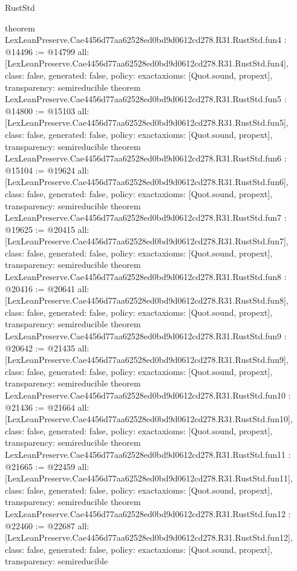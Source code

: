 \begin{lexlean}{RustStd}
\begin{coremodule}
{}
theorem LexLeanPreserve.Cae4456d77aa62528ed0bd9d0612cd278.R31.RustStd.fun4 : @14496 := @14799 {
  all: [LexLeanPreserve.Cae4456d77aa62528ed0bd9d0612cd278.R31.RustStd.fun4],
  class: false,
  generated: false,
  policy: exact{axioms: [Quot.sound, propext]},
  transparency: semireducible
}
theorem LexLeanPreserve.Cae4456d77aa62528ed0bd9d0612cd278.R31.RustStd.fun5 : @14800 := @15103 {
  all: [LexLeanPreserve.Cae4456d77aa62528ed0bd9d0612cd278.R31.RustStd.fun5],
  class: false,
  generated: false,
  policy: exact{axioms: [Quot.sound, propext]},
  transparency: semireducible
}
theorem LexLeanPreserve.Cae4456d77aa62528ed0bd9d0612cd278.R31.RustStd.fun6 : @15104 := @19624 {
  all: [LexLeanPreserve.Cae4456d77aa62528ed0bd9d0612cd278.R31.RustStd.fun6],
  class: false,
  generated: false,
  policy: exact{axioms: [Quot.sound, propext]},
  transparency: semireducible
}
theorem LexLeanPreserve.Cae4456d77aa62528ed0bd9d0612cd278.R31.RustStd.fun7 : @19625 := @20415 {
  all: [LexLeanPreserve.Cae4456d77aa62528ed0bd9d0612cd278.R31.RustStd.fun7],
  class: false,
  generated: false,
  policy: exact{axioms: [Quot.sound, propext]},
  transparency: semireducible
}
theorem LexLeanPreserve.Cae4456d77aa62528ed0bd9d0612cd278.R31.RustStd.fun8 : @20416 := @20641 {
  all: [LexLeanPreserve.Cae4456d77aa62528ed0bd9d0612cd278.R31.RustStd.fun8],
  class: false,
  generated: false,
  policy: exact{axioms: [Quot.sound, propext]},
  transparency: semireducible
}
theorem LexLeanPreserve.Cae4456d77aa62528ed0bd9d0612cd278.R31.RustStd.fun9 : @20642 := @21435 {
  all: [LexLeanPreserve.Cae4456d77aa62528ed0bd9d0612cd278.R31.RustStd.fun9],
  class: false,
  generated: false,
  policy: exact{axioms: [Quot.sound, propext]},
  transparency: semireducible
}
theorem LexLeanPreserve.Cae4456d77aa62528ed0bd9d0612cd278.R31.RustStd.fun10 : @21436 := @21664 {
  all: [LexLeanPreserve.Cae4456d77aa62528ed0bd9d0612cd278.R31.RustStd.fun10],
  class: false,
  generated: false,
  policy: exact{axioms: [Quot.sound, propext]},
  transparency: semireducible
}
theorem LexLeanPreserve.Cae4456d77aa62528ed0bd9d0612cd278.R31.RustStd.fun11 : @21665 := @22459 {
  all: [LexLeanPreserve.Cae4456d77aa62528ed0bd9d0612cd278.R31.RustStd.fun11],
  class: false,
  generated: false,
  policy: exact{axioms: [Quot.sound, propext]},
  transparency: semireducible
}
theorem LexLeanPreserve.Cae4456d77aa62528ed0bd9d0612cd278.R31.RustStd.fun12 : @22460 := @22687 {
  all: [LexLeanPreserve.Cae4456d77aa62528ed0bd9d0612cd278.R31.RustStd.fun12],
  class: false,
  generated: false,
  policy: exact{axioms: [Quot.sound, propext]},
  transparency: semireducible
}
\end{coremodule}
\end{lexlean}
